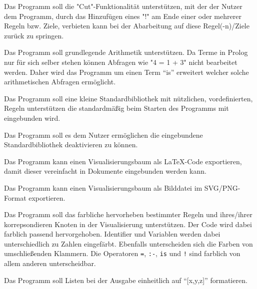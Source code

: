 \documentclass[parskip=full,11pt,twoside]{scrartcl}
\begin{document}

Das Programm soll die "Cut"-Funktionalität unterstützen, mit der der Nutzer dem Programm, durch das Hinzufügen eines "!" am Ende einer oder mehrerer Regeln bzw. Ziele, verbieten kann bei der Abarbeitung auf diese Regel(-n)/Ziele zurück zu springen.


Das Programm soll grundlegende Arithmetik unterstützen. Da Terme in Prolog nur für sich selber stehen können Abfragen wie "4 = 1 + 3" nicht bearbeitet werden. Daher wird das Programm um einen Term \enquote{is} erweitert welcher solche arithmetischen Abfragen ermöglicht.


Das Programm soll eine kleine Standardbibliothek mit nützlichen, vordefinierten, Regeln unterstützen die standardmäßig beim Starten des Programms mit eingebunden wird.


Das Programm soll es dem Nutzer ermöglichen die eingebundene Standardbibliothek deaktivieren zu können.


Das Programm kann einen Visualisierungsbaum als LaTeX-Code exportieren, damit dieser vereinfacht in Dokumente eingebunden werden kann.


Das Programm kann einen Visualisierungsbaum als Bilddatei im SVG/PNG-Format exportieren.


Das Programm soll das farbliche hervorheben bestimmter Regeln und ihres/ihrer korrepsondieren Knoten in der Visualisierung unterstützen. Der Code wird dabei farblich passend hervorgehoben. Identifier und Variablen werden dabei unterschiedlich zu Zahlen eingefärbt. Ebenfalls unterscheiden sich die Farben von umschließenden Klammern. Die Operatoren \texttt{=}, \texttt{:-}, \texttt{is} und \texttt{!} sind farblich von allem anderen unterscheidbar.


Das Programm soll Listen bei der Ausgabe einheitlich auf \enquote{[x,y,z]} formatieren.
\end{document}
